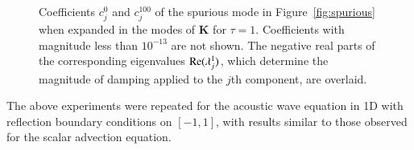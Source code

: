 \documentclass[preprint,10pt]{elsarticle}
\newcommand{\note}[1]{#1}
\begin{document}
\begin{figure}
\centering
{}
\hspace{1em}
\caption{Coefficients $c^0_j$ and $c^{100}_j$ of the spurious mode in Figure~\ref{fig:spurious} when expanded in the modes of $\bm{K}$ for $\tau=1$.  Coefficients with magnitude less than $10^{-13}$ are not shown.   The negative real parts of the corresponding eigenvalues ${\rm Re}(\lambda^1_j)$, which determine the magnitude of damping applied to the $j$th component, are overlaid. }
\label{fig:cmodes}
\end{figure}

The above experiments were repeated for the acoustic wave equation in 1D with reflection boundary conditions on $[-1,1]$, with results similar to those observed for the scalar advection equation.   %

\end{document}
